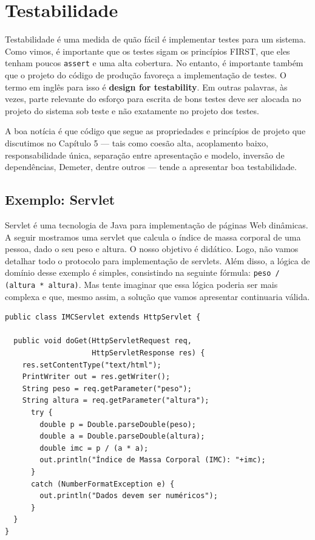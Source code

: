\documentclass[
  11pt,
  twoside]{book}
\newcommand{\passthrough}[1]{#1}
\begin{document}
\hypertarget{testabilidade}{%
\section{Testabilidade}\label{testabilidade}}

 

Testabilidade é uma medida de quão fácil é implementar testes para um
sistema. Como vimos, é importante que os testes sigam os princípios
FIRST, que eles tenham poucos \passthrough{\lstinline!assert!} e uma
alta cobertura. No entanto, é importante também que o projeto do código
de produção favoreça a implementação de testes. O termo em inglês para
isso é \textbf{design for testability}. Em outras palavras, às vezes,
parte relevante do esforço para escrita de bons testes deve ser alocada
no projeto do sistema sob teste e não exatamente no projeto dos testes.

A boa notícia é que código que segue as propriedades e princípios de
projeto que discutimos no Capítulo 5 --- tais como coesão alta,
acoplamento baixo, responsabilidade única, separação entre apresentação
e modelo, inversão de dependências, Demeter, dentre outros --- tende a
apresentar boa testabilidade.

\hypertarget{exemplo-servlet}{%
\subsection{Exemplo: Servlet}\label{exemplo-servlet}}

Servlet é uma tecnologia de Java para implementação de páginas Web
dinâmicas. A seguir mostramos uma servlet que calcula o índice de massa
corporal de uma pessoa, dado o seu peso e altura. O nosso objetivo é
didático. Logo, não vamos detalhar todo o protocolo para implementação
de servlets. Além disso, a lógica de domínio desse exemplo é simples,
consistindo na seguinte fórmula:
\passthrough{\lstinline!peso / (altura * altura)!}. Mas tente imaginar
que essa lógica poderia ser mais complexa e que, mesmo assim, a solução
que vamos apresentar continuaria válida.

\begin{lstlisting}
public class IMCServlet extends HttpServlet {

  public void doGet(HttpServletRequest req, 
                    HttpServletResponse res) {
    res.setContentType("text/html");
    PrintWriter out = res.getWriter();
    String peso = req.getParameter("peso");
    String altura = req.getParameter("altura");
      try {
        double p = Double.parseDouble(peso);
        double a = Double.parseDouble(altura);
        double imc = p / (a * a);
        out.println("Índice de Massa Corporal (IMC): "+imc);
      }
      catch (NumberFormatException e) {
        out.println("Dados devem ser numéricos");
      }
  }
}  
\end{lstlisting}
\end{document}
